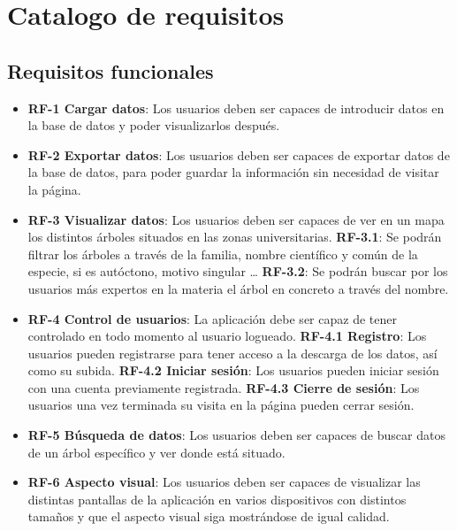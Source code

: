\section{Catalogo de requisitos}
\subsection{Requisitos funcionales}
\begin{itemize}
	\item \textbf{RF-1 Cargar datos}: Los usuarios deben ser capaces de introducir datos en la base de datos y poder visualizarlos después.
	\item \textbf{RF-2 Exportar datos}: Los usuarios deben ser capaces de exportar datos de la base de datos, para poder guardar la información sin necesidad de visitar la página.
	\item \textbf{RF-3 Visualizar datos}: Los usuarios deben ser capaces de ver en un mapa los distintos árboles situados en las zonas universitarias.
	\subitem \textbf{RF-3.1}: Se podrán filtrar los árboles a través de la familia, nombre científico y común de la especie, si es autóctono, motivo singular \ldots
	\subitem \textbf{RF-3.2}: Se podrán buscar por los usuarios más expertos en la materia el árbol en concreto a través del nombre.
	\item \textbf{RF-4 Control de usuarios}: La aplicación debe ser capaz de tener controlado en todo momento al usuario logueado.
	\subitem \textbf{RF-4.1 Registro}: Los usuarios pueden registrarse para tener acceso a la descarga de los datos, así como su subida.
	\subitem \textbf{RF-4.2 Iniciar sesión}: Los usuarios pueden iniciar sesión con una cuenta previamente registrada.
	\subitem \textbf{RF-4.3 Cierre de sesión}: Los usuarios una vez terminada su visita en la página pueden cerrar sesión. 
	\item \textbf{RF-5 Búsqueda de datos}: Los usuarios deben ser capaces de buscar datos de un árbol específico y ver donde está situado.
	\item \textbf{RF-6 Aspecto visual}: Los usuarios deben ser capaces de visualizar las distintas pantallas de la aplicación en varios dispositivos con distintos tamaños y que el aspecto visual siga mostrándose de igual calidad. 

\end{itemize}
